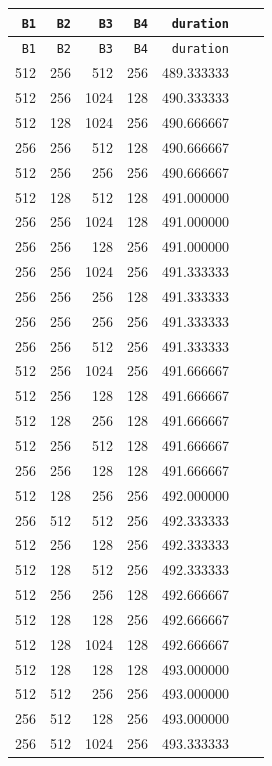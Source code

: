 \documentclass{article}
\begin{document}
{\footnotesize
\begin{longtable}{rrrrrrr}
\hline
\texttt{B1} & \texttt{B2} & \texttt{B3} & \texttt{B4} & \texttt{duration} \\
\hline\endfirsthead
\hline
\texttt{B1} & \texttt{B2} & \texttt{B3} & \texttt{B4} & \texttt{duration} \\
\hline\endhead
512 & 256 & 512 & 256 & 489.333333 \\
512 & 256 & 1024 & 128 & 490.333333 \\
512 & 128 & 1024 & 256 & 490.666667 \\
256 & 256 & 512 & 128 & 490.666667 \\
512 & 256 & 256 & 256 & 490.666667 \\
512 & 128 & 512 & 128 & 491.000000 \\
256 & 256 & 1024 & 128 & 491.000000 \\
256 & 256 & 128 & 256 & 491.000000 \\
256 & 256 & 1024 & 256 & 491.333333 \\
256 & 256 & 256 & 128 & 491.333333 \\
256 & 256 & 256 & 256 & 491.333333 \\
256 & 256 & 512 & 256 & 491.333333 \\
512 & 256 & 1024 & 256 & 491.666667 \\
512 & 256 & 128 & 128 & 491.666667 \\
512 & 128 & 256 & 128 & 491.666667 \\
512 & 256 & 512 & 128 & 491.666667 \\
256 & 256 & 128 & 128 & 491.666667 \\
512 & 128 & 256 & 256 & 492.000000 \\
256 & 512 & 512 & 256 & 492.333333 \\
512 & 256 & 128 & 256 & 492.333333 \\
512 & 128 & 512 & 256 & 492.333333 \\
512 & 256 & 256 & 128 & 492.666667 \\
512 & 128 & 128 & 256 & 492.666667 \\
512 & 128 & 1024 & 128 & 492.666667 \\
512 & 128 & 128 & 128 & 493.000000 \\
512 & 512 & 256 & 256 & 493.000000 \\
256 & 512 & 128 & 256 & 493.000000 \\
256 & 512 & 1024 & 256 & 493.333333 \\

\end{longtable}}
\end{document}
